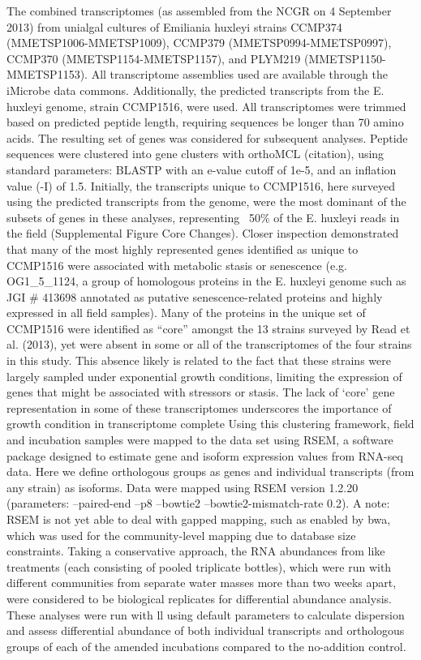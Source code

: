 The combined transcriptomes (as assembled from the NCGR on 4 September 2013) from unialgal cultures of Emiliania huxleyi strains CCMP374 (MMETSP1006-MMETSP1009), CCMP379 (MMETSP0994-MMETSP0997), CCMP370 (MMETSP1154-MMETSP1157), and PLYM219 (MMETSP1150-MMETSP1153). All transcriptome assemblies used are available through the iMicrobe data commons. Additionally, the predicted transcripts from the E. huxleyi genome, strain CCMP1516, were used. All transcriptomes were trimmed based on predicted peptide length, requiring sequences be longer than 70 amino acids. The resulting set of genes was considered for subsequent analyses. Peptide sequences were clustered into gene clusters with orthoMCL (citation), using standard parameters: BLASTP with an e-value cutoff of 1e-5, and an inflation value (-I) of 1.5. Initially, the transcripts unique to CCMP1516, here surveyed using the predicted transcripts from the genome, were the most dominant of the subsets of genes in these analyses, representing ~50\% of the E. huxleyi reads in the field (Supplemental Figure Core Changes). Closer inspection demonstrated that many of the most highly represented genes identified as unique to CCMP1516 were associated with metabolic stasis or senescence (e.g. OG1\_5\_1124, a group of homologous proteins in the E. huxleyi genome such as JGI \# 413698 annotated as putative senescence-related proteins and highly expressed in all field samples). Many of the proteins in the unique set of CCMP1516 were identified as “core” amongst the 13 strains surveyed by Read et al. (2013), yet were absent in some or all of the transcriptomes of the four strains in this study. This absence likely is related to the fact that these strains were largely sampled under exponential growth conditions, limiting the expression of genes that might be associated with stressors or stasis. The lack of ‘core’ gene representation in some of these transcriptomes underscores the importance of growth condition in transcriptome complete
Using this clustering framework, field and incubation samples were mapped to the data set using RSEM, a software package designed to estimate gene and isoform expression values from RNA-seq data. Here we define orthologous groups as genes and individual transcripts (from any strain) as isoforms. Data were mapped using RSEM version 1.2.20 (parameters: --paired-end –p8 –bowtie2 –bowtie2-mismatch-rate 0.2). A note: RSEM is not yet able to deal with gapped mapping, such as enabled by bwa, which was used for the community-level mapping due to database size constraints. Taking a conservative approach, the RNA abundances from like treatments (each consisting of pooled triplicate bottles), which were run with different communities from separate water masses more than two weeks apart, were considered to be biological replicates for differential abundance analysis. These analyses were run with ll using default parameters to calculate dispersion and assess differential abundance of both individual transcripts and orthologous groups of each of the amended incubations compared to the no-addition control. 

